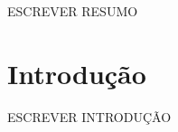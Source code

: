 \documentclass[
	12pt,				%
    oneside,			%
	a4paper,			%
	english,			%
	french,				%
	spanish,			%
	brazil,				%
	]{abntex2}
\begin{document}
\frenchspacing 


\imprimircapa

\imprimirfolhaderosto*

\begin{resumo} 
ESCREVER RESUMO




 \vspace{\onelineskip}
    
 \noindent

\end{resumo} %



\tableofcontents


\chapter{Introdução} %

ESCREVER INTRODUÇÃO

\end{document}
